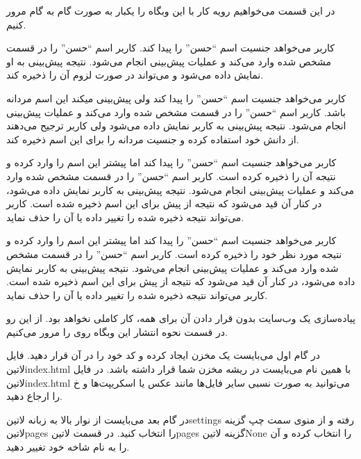 
در این قسمت می‌خواهیم رویه کار با این وبگاه را یکبار به صورت گام به گام مرور کنیم.

 کاربر می‌خواهد جنسیت اسم ``حسن'' را پیدا کند.
 کاربر اسم ``حسن'' را در قسمت مشخص شده وارد می‌کند و عملیات پیش‌بینی انجام می‌شود.
 نتیجه پیش‌بینی به او نمایش داده می‌شود و می‌تواند در صورت لزوم آن را ذخیره کند.

 کاربر می‌خواهد جنسیت اسم ``حسن'' را پیدا کند ولی پیش‌بینی میکند این اسم مردانه باشد.
 کاربر اسم ``حسن'' را در قسمت مشخص شده وارد می‌کند و عملیات پیش‌بینی انجام می‌شود.
 نتیجه پیش‌بینی به کاربر نمایش داده می‌شود ولی کاربر ترجیح می‌دهند از دانش خود استفاده کرده و جنسیت مردانه را برای این اسم ذخیره کند.

 کاربر می‌خواهد جنسیت اسم ``حسن'' را پیدا کند اما پیشتر این اسم را وارد کرده و نتیجه آن را ذخیره کرده است.
 کاربر اسم ``حسن'' را در قسمت مشخص شده وارد می‌کند و عملیات پیش‌بینی انجام می‌شود.
 نتیجه پیش‌بینی به کاربر نمایش داده می‌شود، در کنار آن قید می‌شود که نتیجه از پیش برای این اسم ذخیره شده است.
 کاربر می‌تواند نتیجه ذخیره شده را تغییر داده یا آن را حذف نماید.

 کاربر می‌خواهد جنسیت اسم ``حسن'' را پیدا کند اما پیشتر این اسم را وارد کرده و نتیجه مورد نظر خود را ذخیره کرده است.
 کاربر اسم ``حسن'' را در قسمت مشخص شده وارد می‌کند و عملیات پیش‌بینی انجام می‌شود.
 نتیجه پیش‌بینی به کاربر نمایش داده می‌شود، در کنار آن قید می‌شود که نتیجه از پیش برای این اسم ذخیره شده است.
 کاربر می‌تواند نتیجه ذخیره شده را تغییر داده یا آن را حذف نماید.


پیاده‌سازی یک وب‌سایت بدون قرار دادن آن برای همه، کار کاملی نخواهد بود. از این رو در قسمت نحوه انتشار این وبگاه روی  را مرور می‌کنیم.

در گام اول می‌بایست یک مخزن ایجاد کرده و کد خود را در آن قرار دهید. فایل ‌لاتین{index.html} با همین نام می‌بایست در ریشه مخزن شما قرار داشته باشد.
در فایل ‌لاتین{index.html} می‌توانید به صورت نسبی سایر فایل‌ها مانند عکس یا اسکریپت‌ها و ‌خ را ارجاع دهید.

در گام بعد می‌بایست از نوار بالا به زبانه ‌لاتین{settings} رفته و از منوی سمت چپ گزینه ‌لاتین{pages} را انتخاب کنید.
در قسمت ‌لاتین{pages} گزینه ‌لاتین{None} را انتخاب کرده و آن را به نام شاخه خود تغییر دهید.

